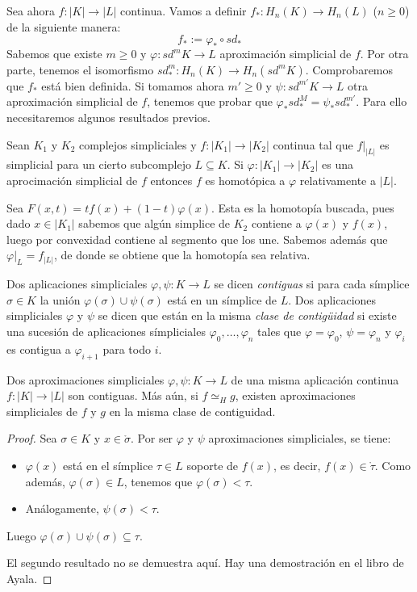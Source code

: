 \documentclass[HS.tex]{subfiles}
\begin{document}
Sea ahora $f:|K|\to|L|$ continua. Vamos a definir $f_*:H_n(K)\to H_n(L)$ ($n\geq 0$) de la siguiente manera:
\[
f_*:=\varphi_*\circ sd_*
\]
Sabemos que existe $m\geq 0$ y $\varphi:sd^mK\to L$ aproximación simplicial de $f$. Por otra parte, tenemos el isomorfismo $sd_*^m:H_n(K)\to H_n(sd^mK)$. Comprobaremos que $f_*$ está bien definida. Si tomamos ahora $m'\geq 0$ y $\psi:sd^{m'}K\to L$ otra aproximación simplicial de $f$, tenemos que probar que $\varphi_*sd_*^M=\psi_*sd_*^{m'}$. Para ello necesitaremos algunos resultados previos.

\begin{prop}
Sean $K_1$ y $K_2$ complejos simpliciales y $f:|K_1|\to|K_2|$ continua tal que $f|_{|L|}$ es simplicial para un cierto subcomplejo $L\subseteq K$. Si $\varphi:|K_1|\to|K_2|$ es una aprocimación simplicial de $f$ entonces $f$ es homotópica a $\varphi$ relativamente a $|L|$.  
\end{prop}
\begin{dem}
Sea $F(x,t)=tf(x)+(1-t)\varphi(x)$. Esta es la homotopía buscada, pues dado $x\in|K_1|$ sabemos que algún simplice de $K_2$ contiene a $\varphi(x)$ y $f(x)$, luego por convexidad contiene al segmento que los une. Sabemos además que $\varphi|_{L}=f_{|L|}$, de donde se obtiene que la homotopía sea relativa.
\QED
\end{dem}

\begin{defi}
Dos aplicaciones simpliciales $\varphi,\psi:K\to L$ se dicen \emph{contiguas} si para cada símplice $\sigma\in K$ la unión $\varphi(\sigma)\cup\psi(\sigma)$ está en un símplice de $L$. Dos aplicaciones simpliciales $\varphi$ y $\psi$ se dicen que están en la misma \emph{clase de contigüidad} si existe una sucesión de aplicaciones símpliciales $\varphi_0,\dots, \varphi_n$ tales que $\varphi=\varphi_0$, $\psi=\varphi_n$ y $\varphi_i$ es contigua a $\varphi_{i+1}$ para todo $i$. 
\end{defi}

\begin{lemma}
Dos aproximaciones simpliciales $\varphi,\psi:K\to L$ de una misma aplicación continua $f:|K|\to|L|$ son contiguas. Más aún, si $f\simeq_H g$, existen aproximaciones simpliciales de $f$ y $g$ en la misma clase de contiguidad.
\end{lemma}
\begin{proof}
Sea $\sigma \in K$ y $x \in \mathring{\sigma}$.
Por ser $\varphi$ y $\psi$ aproximaciones simpliciales, se tiene:
\begin{itemize}
	\item $\varphi(x)$ está en el símplice $\tau \in L$ soporte de $f(x)$, es decir, $f(x) \in \mathring{\tau}$.
	Como además, $\varphi(\sigma) \in L$, tenemos que $\varphi(\sigma) < \tau$.
	\item Análogamente, $\psi(\sigma) < \tau$.
\end{itemize}
Luego $\varphi(\sigma) \cup \psi(\sigma) \subseteq \tau$.

El segundo resultado no se demuestra aquí.
Hay una demostración en el libro de Ayala.
\end{proof}
\end{document}
